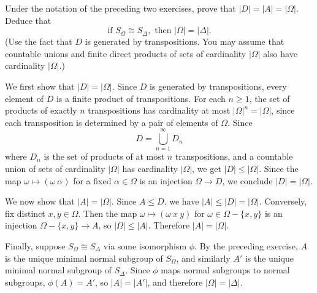 \begin{exercise}\label{ex4.6.8}
	Under the notation of the preceding two exercises, prove that $|D| = |A| = |\Omega|$. Deduce that
	\[\text{if }S_\Omega \cong S_\Delta, \text{ then } |\Omega| = |\Delta|.\]
	(Use the fact that $D$ is generated by transpositions. You may assume that countable unions and finite direct products of sets of cardinality $|\Omega|$ also have cardinality $|\Omega|$.)
\end{exercise}

\begin{sol}
	We first show that $|D| = |\Omega|$. Since $D$ is generated by transpositions, every element of $D$ is a finite product of transpositions. For each $n \geq 1$, the set of products of exactly $n$ transpositions has cardinality at most $|\Omega|^n = |\Omega|$, since each transposition is determined by a pair of elements of $\Omega$. Since
	\[D = \bigcup_{n=1}^\infty D_n\]
	where $D_n$ is the set of products of at most $n$ transpositions, and a countable union of sets of cardinality $|\Omega|$ has cardinality $|\Omega|$, we get $|D| \leq |\Omega|$. Since the map $\omega \mapsto (\omega\ \alpha)$ for a fixed $\alpha \in \Omega$ is an injection $\Omega \to D$, we conclude $|D| = |\Omega|$.

    We now show that $|A| = |\Omega|$. Since $A \leq D$, we have $|A| \leq |D| = |\Omega|$. Conversely, fix distinct $x, y \in \Omega$. Then the map $\omega \mapsto (\omega\ x\ y)$ for $\omega \in \Omega - \{x, y\}$ is an injection $\Omega - \{x, y\} \to A$, so $|\Omega| \leq |A|$. Therefore $|A| = |\Omega|$.

    Finally, suppose $S_\Omega \cong S_\Delta$ via some isomorphism $\phi$. By the preceding exercise, $A$ is the unique minimal normal subgroup of $S_\Omega$, and similarly $A'$ is the unique minimal normal subgroup of $S_\Delta$. Since $\phi$ maps normal subgroups to normal subgroups, $\phi(A) = A'$, so $|A| = |A'|$, and therefore $|\Omega| = |\Delta|$.
\end{sol}